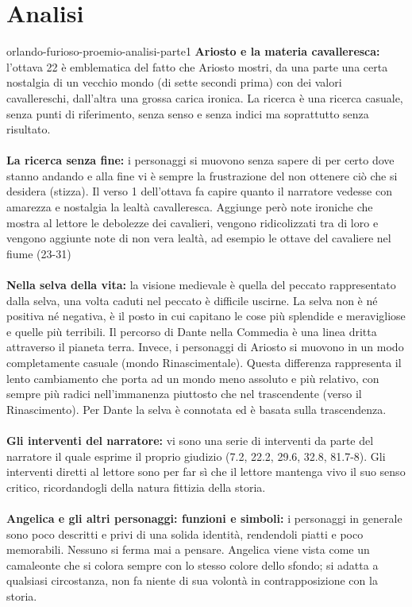 \documentclass[preview]{standalone}
\begin{document}
\genpage

\section{Analisi}

\begin{snippet}{orlando-furioso-proemio-analisi-parte1}
    \textbf{Ariosto e la materia cavalleresca:} l'ottava 22 è emblematica del fatto che Ariosto mostri, da una parte una
    certa nostalgia di un vecchio mondo (di sette secondi prima) con dei valori cavallereschi,
    dall'altra una grossa carica ironica.
    La ricerca è una ricerca casuale, senza punti di riferimento, senza senso e senza indici
    ma soprattutto senza risultato.
    \\\\
    \textbf{La ricerca senza fine:} i personaggi si muovono senza sapere di per certo dove stanno andando
    e alla fine vi è sempre la frustrazione del non ottenere ciò che si desidera (stizza).
    Il verso 1 dell'ottava  fa capire quanto il narratore
    vedesse con amarezza e nostalgia la lealtà cavalleresca.
    Aggiunge però note ironiche che mostra al lettore le debolezze dei cavalieri, vengono
    ridicolizzati tra di loro e vengono aggiunte note di non vera lealtà, ad esempio le ottave del
    cavaliere nel fiume (23-31)
    \\\\
    \textbf{Nella selva della vita:} la visione medievale è quella del peccato rappresentato dalla selva, una volta caduti
    nel peccato è difficile uscirne. La selva non è né positiva né negativa, è il posto
    in cui capitano le cose più splendide e meravigliose e quelle più terribili.
    Il percorso di Dante nella Commedia è una linea dritta attraverso il pianeta terra.
    Invece, i personaggi di Ariosto si muovono in un modo completamente casuale (mondo Rinascimentale).
    Questa differenza rappresenta il lento cambiamento che porta ad un mondo meno assoluto e più relativo,
    con sempre più radici nell'immanenza piuttosto che nel trascendente (verso il Rinascimento).
    Per Dante la selva è connotata ed è basata sulla trascendenza.
    \\\\
    \textbf{Gli interventi del narratore:} vi sono una serie di interventi da parte del narratore il quale
    esprime il proprio giudizio (7.2, 22.2, 29.6, 32.8, 81.7-8).
    Gli interventi diretti al lettore sono per far sì che il lettore mantenga vivo il suo senso critico, ricordandogli
    della natura fittizia della storia.
    \\\\
    \textbf{Angelica e gli altri personaggi: funzioni e simboli:}
    i personaggi in generale sono poco descritti e privi di una solida identità, rendendoli piatti e
    poco memorabili. Nessuno si ferma mai a pensare.
    Angelica viene vista come un camaleonte che si colora sempre con lo stesso colore dello
    sfondo; si adatta a qualsiasi circostanza, non fa niente di sua volontà in contrapposizione con
    la storia.
\end{snippet}
\end{document}
